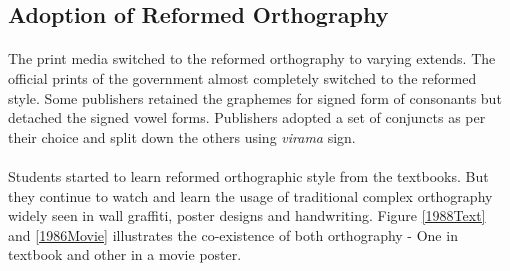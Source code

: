 \documentclass[10pt]{article}
\begin{document}
\subsection{Adoption of Reformed Orthography}
\paragraph{}
The print media switched to the reformed orthography to varying extends. The official prints of the government almost completely switched to the reformed style. Some publishers retained the graphemes for signed form of consonants but detached the signed vowel forms. Publishers adopted a set of conjuncts as per their choice and split down the others using \textit{virama} sign.
\paragraph{}
Students started to learn reformed orthographic style from the textbooks. But they continue to watch and learn the usage of traditional complex orthography widely seen in wall graffiti, poster designs and handwriting. Figure \ref{1988Text} and \ref{1986Movie} illustrates the co-existence of both orthography - One in textbook and other in a movie poster.
\end{document}
